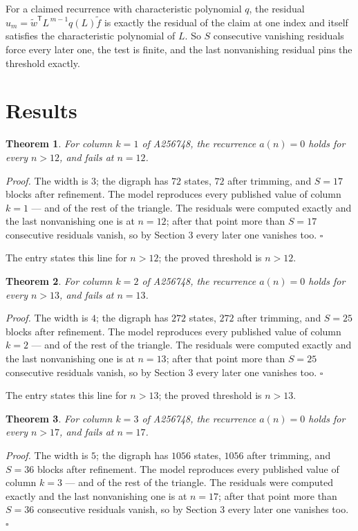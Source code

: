 \documentclass[11pt]{article}
\newtheorem{theorem}{Theorem}
\theoremstyle{definition}
\begin{document}
For a claimed recurrence with characteristic polynomial $q$, the residual $u_m = \tilde w^{\mathsf T}L^{\,m-1}q(L)\tilde f$ is exactly the residual of the claim at one index and itself satisfies the characteristic polynomial of $L$. So $S$ consecutive vanishing residuals force every later one, the test is finite, and the last nonvanishing residual pins the threshold exactly.

\section{Results}

\begin{theorem} For column $k = 1$ of A256748, the recurrence $a(n) = 0$ holds for every $n > 12$, and fails at $n = 12$.\end{theorem}

{\itshape Proof.} The width is $3$; the digraph has $72$ states, $72$ after trimming, and $S = 17$ blocks after refinement. The model reproduces every published value of column $k = 1$ --- and of the rest of the triangle. The residuals were computed exactly and the last nonvanishing one is at $n = 12$; after that point more than $S = 17$ consecutive residuals vanish, so by Section 3 every later one vanishes too. $\square$

The entry states this line for $n > 12$; the proved threshold is $n > 12$.

\begin{theorem} For column $k = 2$ of A256748, the recurrence $a(n) = 0$ holds for every $n > 13$, and fails at $n = 13$.\end{theorem}

{\itshape Proof.} The width is $4$; the digraph has $272$ states, $272$ after trimming, and $S = 25$ blocks after refinement. The model reproduces every published value of column $k = 2$ --- and of the rest of the triangle. The residuals were computed exactly and the last nonvanishing one is at $n = 13$; after that point more than $S = 25$ consecutive residuals vanish, so by Section 3 every later one vanishes too. $\square$

The entry states this line for $n > 13$; the proved threshold is $n > 13$.

\begin{theorem} For column $k = 3$ of A256748, the recurrence $a(n) = 0$ holds for every $n > 17$, and fails at $n = 17$.\end{theorem}

{\itshape Proof.} The width is $5$; the digraph has $1056$ states, $1056$ after trimming, and $S = 36$ blocks after refinement. The model reproduces every published value of column $k = 3$ --- and of the rest of the triangle. The residuals were computed exactly and the last nonvanishing one is at $n = 17$; after that point more than $S = 36$ consecutive residuals vanish, so by Section 3 every later one vanishes too. $\square$
\end{document}
